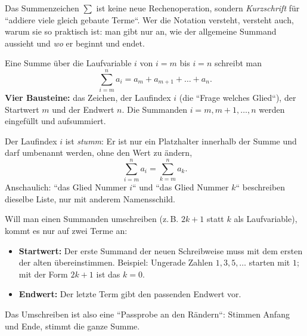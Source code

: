 


Das Summenzeichen $\sum$ ist keine neue Rechenoperation, sondern
\emph{Kurzschrift} für ``addiere viele gleich gebaute Terme``. Wer die
Notation versteht, versteht auch, warum sie so praktisch ist: man gibt
nur an, wie der allgemeine Summand aussieht und \emph{wo} er beginnt und
endet.

\begin{werkzeugkasten}
Eine Summe über die Laufvariable $i$ von $i=m$ bis $i=n$ schreibt man
\begin{equation}
  \sum_{i=m}^{n} a_i = a_m + a_{m+1} + \dots + a_n .
\end{equation}
\textbf{Vier Bausteine:} das Zeichen, der Laufindex $i$ (die ``Frage
welches Glied``), der Startwert $m$ und der Endwert $n$. Die Summanden
$i=m,m+1,\dots,n$ werden eingefüllt und aufsummiert.

Der Laufindex $i$ ist \emph{stumm}: Er ist nur ein Platzhalter innerhalb
der Summe und darf umbenannt werden, ohne den Wert zu ändern,
\begin{equation}
  \sum_{i=m}^{n} a_i = \sum_{k=m}^{n} a_k .
\end{equation}
Anschaulich: ``das Glied Nummer $i$`` und ``das Glied Nummer $k$``
beschreiben dieselbe Liste, nur mit anderem Namensschild.
\end{werkzeugkasten}

\begin{werkzeugkasten}
Will man einen Summanden umschreiben (z.\,B. $2k+1$ statt $k$ als
Laufvariable), kommt es nur auf zwei Terme an:
\begin{itemize}
  \item \textbf{Startwert:} Der erste Summand der neuen Schreibweise muss
        mit dem ersten der alten übereinstimmen. Beispiel: Ungerade Zahlen
        $1,3,5,\dots$ starten mit $1$; mit der Form $2k+1$ ist das
        $k=0$.
  \item \textbf{Endwert:} Der letzte Term gibt den passenden Endwert vor.
\end{itemize}
Das Umschreiben ist also eine ``Passprobe an den Rändern``: Stimmen
Anfang und Ende, stimmt die ganze Summe.
\end{werkzeugkasten}

